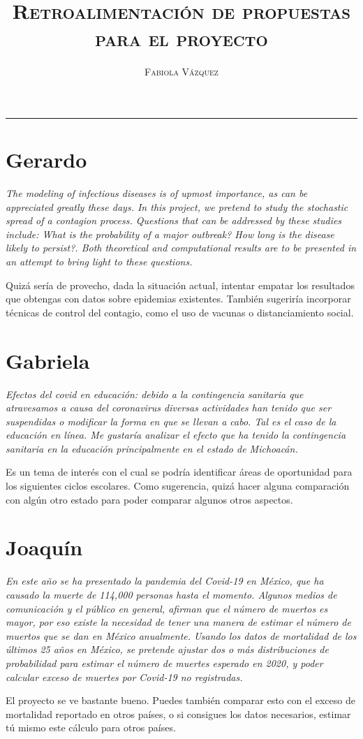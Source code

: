 \documentclass[12pt,letterpaper]{article}
\title{\textsc{Retroalimentación de propuestas para el proyecto}}
\author{\textsc{Fabiola Vázquez}}
\begin{document}
\maketitle
\hrule 

\section{Gerardo}
\textit{The modeling of infectious diseases is of upmost importance, as can be appreciated greatly these days. In this project, we pretend to study the stochastic spread of a contagion process. Questions that can be addressed by these studies include: What is the probability of a major outbreak? How long is the disease likely to persist?. Both theoretical and computational results are to be presented in an attempt to bring light to these questions.}

Quizá sería de provecho, dada la situación actual, intentar empatar los resultados que obtengas con datos sobre epidemias existentes.  También sugeriría incorporar técnicas de control del contagio, como el uso de vacunas o distanciamiento social.
\section{Gabriela}
\textit{Efectos del covid en educación: debido a la contingencia sanitaria que atravesamos a causa del coronavirus diversas actividades han tenido que ser suspendidas o modificar la forma en que se llevan a cabo. Tal es el caso de la educación en línea. Me gustaría analizar el efecto que ha tenido la contingencia sanitaria en la educación principalmente en el estado de Michoacán.}

Es un tema de interés con el cual se podría identificar áreas de oportunidad para los siguientes ciclos escolares. Como sugerencia, quizá hacer alguna comparación con algún otro estado para poder comparar algunos otros aspectos.

\section{Joaquín}
\textit{En este año se ha presentado la pandemia del Covid-19 en México, que ha causado la muerte de 114,000 personas hasta el momento. Algunos medios de comunicación y el público en general, afirman que el número de muertos es mayor, por eso existe la necesidad de tener una manera de estimar el número de muertos que se dan en México anualmente.
Usando los datos de mortalidad de los últimos 25 años en México, se pretende ajustar dos o más distribuciones de probabilidad para estimar el número de muertes esperado en 2020, y poder calcular exceso de muertes por Covid-19 no registradas.}

El proyecto se ve bastante bueno. Puedes también comparar esto con el exceso de mortalidad reportado en otros países, o si consigues los datos necesarios, estimar tú mismo este cálculo para otros países.
\end{document}
